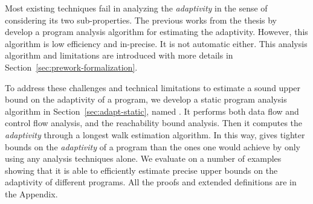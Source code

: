 Most existing techniques fail
in analyzing the \emph{adaptivity} in the sense of considering its two sub-properties.
The previous works from the thesis by~\cite{weihao22}
develop a program analysis algorithm for estimating the adaptivity.
However, this algorithm is low efficiency and in-precise. It is not automatic either. 
This analysis algorithm and limitations are introduced with more details in Section~\ref{sec:prework-formalization}.

To address these challenges and technical limitations to estimate a sound upper bound on the adaptivity of a program, 
we develop a static program analysis algorithm in Section~\ref{sec:adapt-static}, named {\THESYSTEM}.
It performs both data flow and control flow analysis, and the reachability bound analysis. 
Then it computes the \emph{adaptivity} through a longest walk estimation algorithm.
In this way, {\THESYSTEM} gives tighter bounds on the \emph{adaptivity} of a program than the ones one would achieve by only using any analysis techniques alone.
We evaluate {\THESYSTEM} on a number of examples showing that it is able to efficiently estimate precise upper bounds on the adaptivity of different programs. 
All the proofs and extended definitions are in the Appendix.
